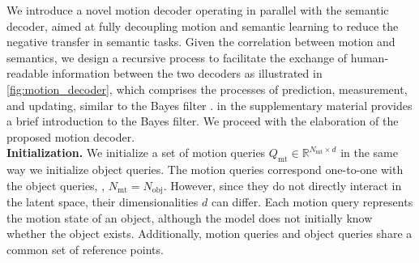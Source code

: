 We introduce a novel motion decoder operating in parallel with the semantic decoder, aimed at fully decoupling motion and semantic learning to reduce the negative transfer in semantic tasks. Given the correlation between motion and semantics, we design a recursive process to facilitate the exchange of human-readable information between the two decoders as illustrated in \cref{fig:motion_decoder}, which comprises the processes of prediction, measurement, and updating, similar to the Bayes filter \cite{thrun2005probabilistic}.  in the supplementary material provides a brief introduction to the Bayes filter. We proceed with the elaboration of the proposed motion decoder.\\

\textbf{Initialization.} We initialize a set of motion queries $Q_{\text{mt}} \in \mathbb{R}^{N_{\text{mt}} \times d}$ in the same way we initialize object queries. The motion queries correspond one-to-one with the object queries, \ie, $N_{\text{mt}} = N_{\text{obj}}$. However, since they do not directly interact in the latent space, their dimensionalities $d$ can differ. Each motion query represents the motion state of an object, although the model does not initially know whether the object exists. Additionally, motion queries and object queries share a common set of reference points. \\

